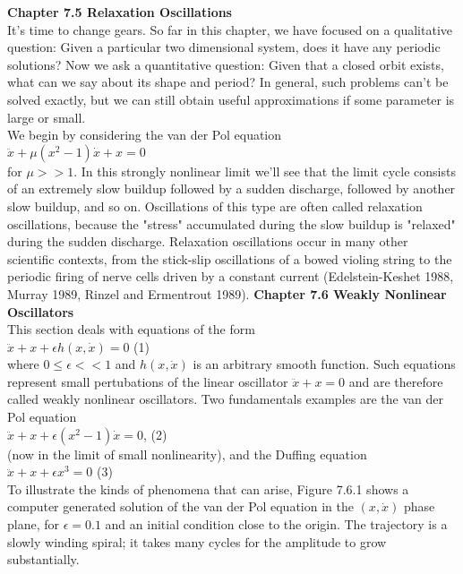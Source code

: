 \documentclass{article}
\newcommand\tab[1][1cm]{\hspace*{#1}}
\begin{document}
\textbf {Chapter 7.5 Relaxation Oscillations} \\ 
It's time to change gears. So far in this chapter, we have focused on a qualitative question: Given a particular two dimensional system, does it have any periodic solutions? Now we ask a quantitative question: Given that a closed orbit exists, what can we say about its shape and period? In general, such problems can't be solved exactly, but we can still obtain useful approximations if some parameter is large or small. \\ \tab
We begin by considering the van der Pol equation \\ \tab
$\ddot{x}+\mu (x^{2}-1)\dot{x}+x=0$ \\ 
for $\mu >> 1$. In this strongly nonlinear limit we'll see that the limit cycle consists of an extremely slow buildup followed by a sudden discharge, followed by another slow buildup, and so on. Oscillations of this type are often called relaxation oscillations, because the "stress" accumulated during the slow buildup is "relaxed" during the sudden discharge. Relaxation oscillations occur in many other scientific contexts, from the stick-slip oscillations of a bowed violing string to the periodic firing of nerve cells driven by a constant current (Edelstein-Keshet 1988, Murray 1989, Rinzel and Ermentrout 1989). 
\textbf {Chapter 7.6 Weakly Nonlinear Oscillators} \\ 
This section deals with equations of the form \\ \tab
$\ddot{x}+x+\epsilon h(x, \dot{x})=0$ \tab (1) \\
where $0\leq \epsilon << 1$ and $h(x, \dot{x})$ is an arbitrary smooth function. Such equations represent small pertubations of the linear oscillator $\ddot{x}+x=0$ and are therefore called weakly nonlinear oscillators. Two fundamentals examples are the van der Pol equation \\ \tab
$\ddot{x}+x+\epsilon(x^{2}-1)\dot{x}=0$, \tab (2)\\ 
(now in the limit of small nonlinearity), and the Duffing equation \\ \tab
$\ddot{x}+x+\epsilon x^{3}=0$ \tab (3) \\
To illustrate the kinds of phenomena that can arise, Figure 7.6.1 shows a computer generated solution of the van der Pol equation in the $(x, \dot{x})$ phase plane, for $\epsilon=0.1$ and an initial condition close to the origin. The trajectory is a slowly winding spiral; it takes many cycles for the amplitude to grow substantially. \\ 
\end{document}
